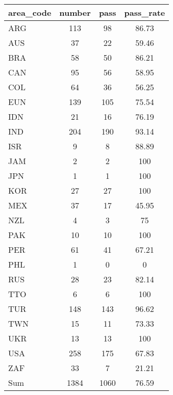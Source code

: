 \documentclass[]{article}
\begin{document}
\begin{tabular}{lccc} \hline
area\_code & number & pass & pass\_rate \\ \hline
ARG & 113 & 98 & 86.73 \\
AUS & 37 & 22 & 59.46 \\
BRA & 58 & 50 & 86.21 \\
CAN & 95 & 56 & 58.95 \\
COL & 64 & 36 & 56.25 \\
EUN & 139 & 105 & 75.54 \\
IDN & 21 & 16 & 76.19 \\
IND & 204 & 190 & 93.14 \\
ISR & 9 & 8 & 88.89 \\
JAM & 2 & 2 & 100 \\
JPN & 1 & 1 & 100 \\
KOR & 27 & 27 & 100 \\
MEX & 37 & 17 & 45.95 \\
NZL & 4 & 3 & 75 \\
PAK & 10 & 10 & 100 \\
PER & 61 & 41 & 67.21 \\
PHL & 1 & 0 & 0 \\
RUS & 28 & 23 & 82.14 \\
TTO & 6 & 6 & 100 \\
TUR & 148 & 143 & 96.62 \\
TWN & 15 & 11 & 73.33 \\
UKR & 13 & 13 & 100 \\
USA & 258 & 175 & 67.83 \\
ZAF & 33 & 7 & 21.21 \\
 Sum & 1384 & 1060 & 76.59 \\ \hline
\end{tabular}
\end{document}

